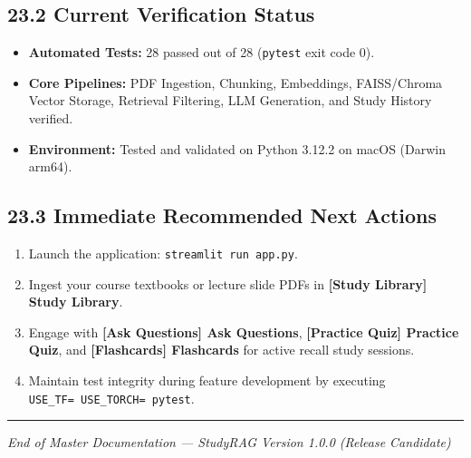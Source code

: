 \documentclass[
]{article}
\providecommand{\tightlist}{%
  \setlength{\itemsep}{0pt}\setlength{\parskip}{0pt}}
\begin{document}
\subsection{23.2 Current Verification
Status}\label{current-verification-status}

\begin{itemize}
\tightlist
\item
  \textbf{Automated Tests:} 28 passed out of 28 (\texttt{pytest} exit
  code 0).
\item
  \textbf{Core Pipelines:} PDF Ingestion, Chunking, Embeddings,
  FAISS/Chroma Vector Storage, Retrieval Filtering, LLM Generation, and
  Study History verified.
\item
  \textbf{Environment:} Tested and validated on Python 3.12.2 on macOS
  (Darwin arm64).
\end{itemize}

\subsection{23.3 Immediate Recommended Next
Actions}\label{immediate-recommended-next-actions}

\begin{enumerate}
\def\labelenumi{\arabic{enumi}.}
\tightlist
\item
  Launch the application: \texttt{streamlit\ \allowbreak run\ \allowbreak app.\allowbreak py}.
\item
  Ingest your course textbooks or lecture slide PDFs in \textbf{{[}Study
  Library{]} Study Library}.
\item
  Engage with \textbf{{[}Ask Questions{]} Ask Questions},
  \textbf{{[}Practice Quiz{]} Practice Quiz}, and
  \textbf{{[}Flashcards{]} Flashcards} for active recall study sessions.
\item
  Maintain test integrity during feature development by executing
  \texttt{USE\_\allowbreak TF=\ \allowbreak USE\_\allowbreak TORCH=\ \allowbreak pytest}.
\end{enumerate}

\begin{center}\rule{0.5\linewidth}{0.5pt}\end{center}

\emph{End of Master Documentation --- StudyRAG Version 1.0.0 (Release
Candidate)}
\end{document}
